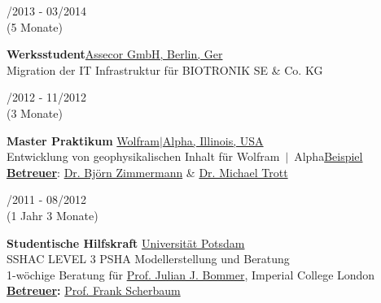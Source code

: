 \documentclass{article}
\newcommand{\spacingWork}{0.25cm}
\begin{document}
\begin{minipage}[t]{0.69\textwidth}
\begin{minipage}[t]{0.99\textwidth}
		\vspace{\spacingWork}

		\begin{minipage}[t]{0.2\textwidth}
			/2013 - 03/2014 \\(5 Monate)
		\end{minipage}
		\hfill
		\begin{minipage}[t]{0.75\textwidth}
			\textbf{Werksstudent}\hfill \href{https://assecor.de/}{\color{pblue}Assecor GmbH, Berlin, Ger}\\
			Migration der IT Infrastruktur für BIOTRONIK SE \& Co. KG
		\end{minipage}
		
		\vspace{\spacingWork}
		
				\begin{minipage}[t]{0.2\textwidth}
				/2012 - 11/2012 \\(3 Monate)
				\end{minipage}
				\hfill
				\begin{minipage}[t]{0.75\textwidth}
				\textbf{Master Praktikum}\hfill	
				\href{https:///www.wolframalpha.com/}{\color{pblue}Wolfram$\mid$Alpha, Illinois, USA}\\
				Entwicklung von geophysikalischen Inhalt für Wolfram$~\mid~$Alpha\hfill \href{https://m.wolframalpha.com/input/?i=moment+magnitude}{\color{pblue}Beispiel}\\
				\textbf{\underline{Betreuer}}: \href{mailto:bjornz@wolfram.com }{\color{pblue}Dr. Björn Zimmermann} \&	\href{mailto:mtrott@wolfram.com }{\color{pblue} Dr. Michael Trott}
				\end{minipage}
				
		\vspace{\spacingWork}
		
				\begin{minipage}[t]{0.2\textwidth}
				/2011 - 08/2012 \\(1 Jahr 3 Monate)
				\end{minipage}
				\hfill
				\begin{minipage}[t]{0.75\textwidth}
				\textbf{Studentische Hilfskraft}\hfill		
				\href{https://www.uni-potsdam.de/}{\color{pblue}Universität Potsdam}\\
				SSHAC LEVEL 3 PSHA Modellerstellung und Beratung\\
				1-wöchige Beratung für \href{https://www.imperial.ac.uk/people/j.bommer}{\color{pblue}Prof. Julian J. Bommer}, Imperial College London\\
				\textbf{\underline{Betreuer}:} \href{http://www.geo.uni-potsdam.de/mitarbeiterdetails/show/96/Frank_Scherbaum.html/}{\color{pblue}Prof. Frank Scherbaum}				
				\end{minipage}
				

\end{minipage}
\end{minipage}
\end{document}
